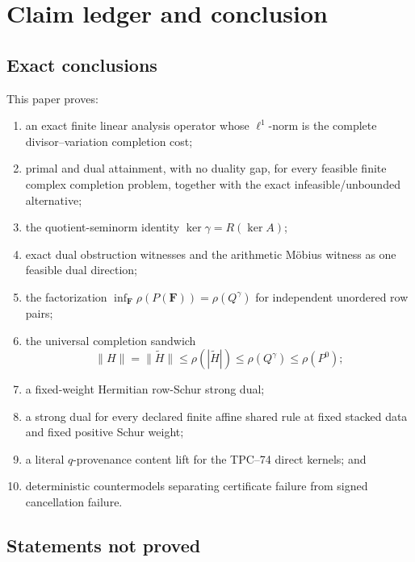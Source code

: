 \section{Claim ledger and conclusion}
\label{sec:claim-boundary}

\subsection{Exact conclusions}

This paper proves:
\begin{enumerate}[label=\textup{(\arabic*)},leftmargin=2.8em]
 \item an exact finite linear analysis operator whose \(\ell^1\)-norm is
       the complete divisor--variation completion cost;
 \item primal and dual attainment, with no duality gap, for every feasible
       finite complex completion problem, together with the exact
       infeasible/unbounded alternative;
 \item the quotient-seminorm identity
       \(\ker\gamma=R(\ker A)\);
 \item exact dual obstruction witnesses and the arithmetic M\"obius
       witness as one feasible dual direction;
 \item the factorization
       \(\inf_{\boldsymbol F}\rho(P(\boldsymbol F))=\rho(Q^\gamma)\)
       for independent unordered row
       pairs;
 \item the universal completion sandwich
       \[
       \|H\|=\|\widetilde H\|
       \le\rho(|\widetilde H|)
       \le\rho(Q^\gamma)\le\rho(P^0);
       \]
 \item a fixed-weight Hermitian row-Schur strong dual;
 \item a strong dual for every declared finite affine shared rule at
       fixed stacked data and fixed positive Schur weight;
 \item a literal \(q\)-provenance content lift for the TPC--74 direct
       kernels; and
 \item deterministic countermodels separating certificate failure from
       signed cancellation failure.
\end{enumerate}

\subsection{Statements not proved}

